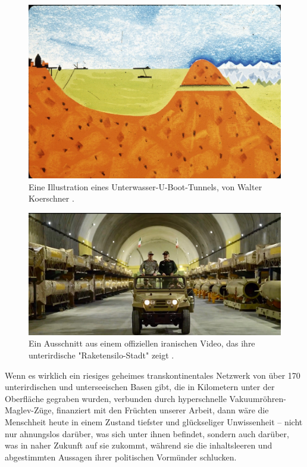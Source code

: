 \documentclass[10pt,twocolumn,letterpaper]{article}
\begin{document}
\begin{figure}[t]
\begin{center}
   \includegraphics[width=1\linewidth]{sub.jpg}
\end{center}
   \caption{Eine Illustration eines Unterwasser-U-Boot-Tunnels, von Walter Koerschner \cite{22,23}.}
\label{fig:6}
\label{fig:onecol}

\end{figure}

\begin{figure}[t]
\begin{center}
   \includegraphics[width=1\linewidth]{iran.jpeg}
\end{center}
   \caption{Ein Ausschnitt aus einem offiziellen iranischen Video, das ihre unterirdische "Raketensilo-Stadt" zeigt \cite{39,40}.}
\label{fig:12}
\label{fig:onecol}
\end{figure}

Wenn es wirklich ein riesiges geheimes transkontinentales Netzwerk von über 170 unterirdischen und unterseeischen Basen gibt, die in Kilometern unter der Oberfläche gegraben wurden, verbunden durch hyperschnelle Vakuumröhren-Maglev-Züge, finanziert mit den Früchten unserer Arbeit, dann wäre die Menschheit heute in einem Zustand tiefster und glückseliger Unwissenheit – nicht nur ahnungslos darüber, was sich unter ihnen befindet, sondern auch darüber, was in naher Zukunft auf sie zukommt, während sie die inhaltsleeren und abgestimmten Aussagen ihrer politischen Vormünder schlucken.
\end{document}
